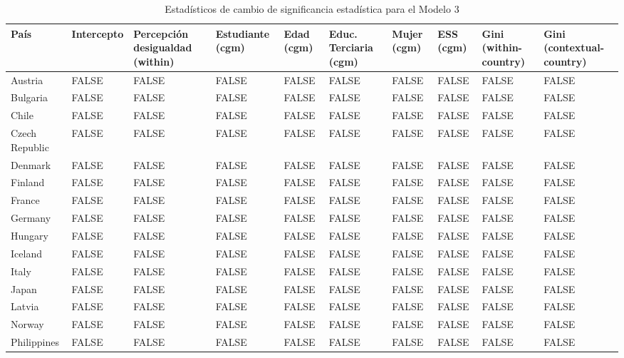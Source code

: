 \documentclass[
  12pt,
  a4paper,
]{article}
\begin{document}
\begin{table}[H]

\caption{\label{tab:table7}\label{tab:table7} Estadísticos de cambio de significancia estadística para el Modelo 3}
\centering
\fontsize{10}{12}\selectfont
\begin{tabu} to 
\toprule
\textbf{País} & \textbf{Intercepto} & \textbf{Percepción desigualdad (within)} & \textbf{Estudiante (cgm)} & \textbf{Edad (cgm)} & \textbf{Educ. Terciaria (cgm)} & \textbf{Mujer (cgm)} & \textbf{ESS (cgm)} & \textbf{Gini (within-country)} & \textbf{Gini (contextual-country)}\\
\midrule
Austria & FALSE & FALSE & FALSE & FALSE & FALSE & FALSE & FALSE & FALSE & FALSE\\
Bulgaria & FALSE & FALSE & FALSE & FALSE & FALSE & FALSE & FALSE & FALSE & FALSE\\
Chile & FALSE & FALSE & FALSE & FALSE & FALSE & FALSE & FALSE & FALSE & FALSE\\
Czech Republic & FALSE & FALSE & FALSE & FALSE & FALSE & FALSE & FALSE & FALSE & FALSE\\
Denmark & FALSE & FALSE & FALSE & FALSE & FALSE & FALSE & FALSE & FALSE & FALSE\\
\addlinespace
Finland & FALSE & FALSE & FALSE & FALSE & FALSE & FALSE & FALSE & FALSE & FALSE\\
France & FALSE & FALSE & FALSE & FALSE & FALSE & FALSE & FALSE & FALSE & FALSE\\
Germany & FALSE & FALSE & FALSE & FALSE & FALSE & FALSE & FALSE & FALSE & FALSE\\
Hungary & FALSE & FALSE & FALSE & FALSE & FALSE & FALSE & FALSE & FALSE & FALSE\\
Iceland & FALSE & FALSE & FALSE & FALSE & FALSE & FALSE & FALSE & FALSE & FALSE\\
\addlinespace
Italy & FALSE & FALSE & FALSE & FALSE & FALSE & FALSE & FALSE & FALSE & FALSE\\
Japan & FALSE & FALSE & FALSE & FALSE & FALSE & FALSE & FALSE & FALSE & FALSE\\
Latvia & FALSE & FALSE & FALSE & FALSE & FALSE & FALSE & FALSE & FALSE & FALSE\\
Norway & FALSE & FALSE & FALSE & FALSE & FALSE & FALSE & FALSE & FALSE & FALSE\\
Philippines & FALSE & FALSE & FALSE & FALSE & FALSE & FALSE & FALSE & FALSE & FALSE\\

\end{tabu}
\end{table}
\end{document}

